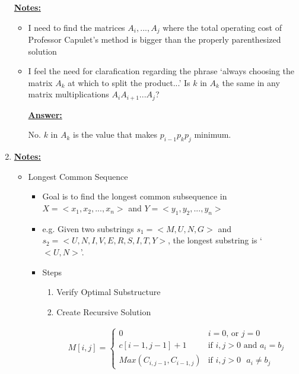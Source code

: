 \documentclass[12pt]{article}
\begin{document}
\begin{enumerate}[1.]

    \bigskip

    \underline{\textbf{Notes:}}

    \bigskip

    \begin{itemize}
        \item I need to find the matrices $A_i, ..., A_j$ where the total operating cost of Professor Capulet's
        method is bigger than the properly parenthesized solution
        \item I feel the need for clarafication regarding the phrase `always choosing the matrix $A_k$ at which to split the product...'
        Is $k$ in $A_k$ the same in any matrix multiplications $A_iA_{i+1}...A_j$?

        \bigskip

        \underline{\textbf{Answer:}}

        \bigskip

        No. $k$ in $A_k$ is the value that makes $p_{i-1}p_kp_j$ minimum.
    \end{itemize}

    \item

    \bigskip

    \underline{\textbf{Notes:}}

    \bigskip

    \begin{itemize}
        \item Longest Common Sequence
        \begin{itemize}
            \item Goal is to find the longest common subsequence in $X = <x_1, x_2, ..., x_n>$ and $Y = <y_1, y_2, ... , y_n>$
            \item e.g. Given two substrings $s_1 = <M,U,N,G>$ and $s_2 = <U,N,I,V,E,R,S,I,T,Y>$, the longest
            substring is `$<U,N>$'.
            \item Steps
            \begin{enumerate}[1.]
                \item Verify Optimal Substructure
                \item Create Recursive Solution

                \bigskip

                \begin{align}
                    M[i,j] = \begin{cases}
                        0 & \text{$i = 0$, or $j = 0$}\\
                        c[i-1,j-1]+1 & \text{if $i,j > 0$ and $a_i = b_j$}\\
                        Max(C_{i,j-1},C_{i-1,j}) & \text{if $i,j > 0$ $a_i \neq b_j$}
                    \end{cases}
                \end{align}


\end{enumerate}
\end{itemize}
\end{itemize}
\end{enumerate}
\end{document}

